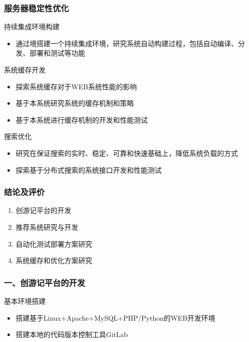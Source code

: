 \documentclass{beamer}
\begin{document}
\begin{frame}
  \frametitle{服务器稳定性优化}
  \begin{block}{持续集成环境构建 }
    \begin{itemize}
      \item 通过境搭建一个持续集成环境，研究系统自动构建过程，包括自动编译、分发、部署和测试等功能
    \end{itemize}
  \end{block}
  \begin{block}{系统缓存开发}
  	\begin{itemize}
  		\item 探索系统缓存对于WEB系统性能的影响
      \item 基于本系统研究系统的缓存机制和策略
      \item 基于本系统进行缓存机制的开发和性能测试
  	\end{itemize}
  \end{block}
  \begin{block}{搜索优化 }
  	\begin{itemize}
  		\item 研究在保证搜索的实时、稳定、可靠和快速基础上，降低系统负载的方式
      \item 探索基于分布式搜索的系统接口开发和性能测试
  	\end{itemize}
  \end{block}
\end{frame}

\begin{frame}
  \frametitle{结论及评价}
  \begin{enumerate}
      \item<1-> 创游记平台的开发
      \item<1-> 推荐系统研究与开发
      \item<1-> 自动化测试部署方案研究
      \item<1-> 系统缓存和优化方案研究
  \end{enumerate}
\end{frame}

\begin{frame}
  \frametitle{一、创游记平台的开发}
  \begin{block}{基本环境搭建 }
	  \begin{itemize}
		  \item 搭建基于Linux+Apache+MySQL+PHP/Python的WEB开发环境
      \item 搭建本地的代码版本控制工具GitLab
	  \end{itemize}
  \end{block}
\end{frame}
\end{document}
